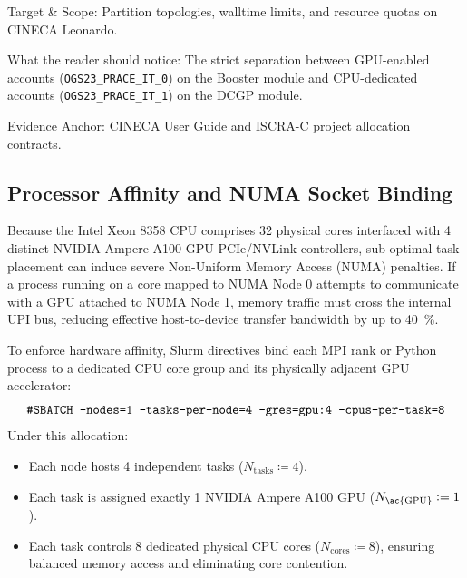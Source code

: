 \begin{table}[htbp]
\begin{threeparttable}
\begin{tablenotes}[flushleft]
      \footnotesize
    \item Target \& Scope: Partition topologies, walltime limits,
      and resource quotas on \ac{CINECA} Leonardo.
    \item What the reader should notice: The strict separation
      between \ac{GPU}-enabled accounts
      (\texttt{OGS23\_PRACE\_IT\_0}) on the Booster module and
      \ac{CPU}-dedicated accounts (\texttt{OGS23\_PRACE\_IT\_1}) on the
      \ac{DCGP} module.
    \item Evidence Anchor: \ac{CINECA} User Guide and ISCRA-C project
      allocation contracts.
    \end{tablenotes}
  \end{threeparttable}
\end{table}

\subsection{Processor Affinity and NUMA Socket Binding}
Because the Intel Xeon 8358 \ac{CPU} comprises \num{32} physical cores
interfaced with \num{4} distinct NVIDIA Ampere A100 \ac{GPU}
PCIe/NVLink controllers,
sub-optimal task placement can induce severe Non-Uniform Memory
Access (\ac{NUMA}) penalties. If a process running on a core mapped
to NUMA Node 0 attempts to communicate with a \ac{GPU} attached to NUMA
Node 1, memory traffic must cross the internal UPI bus, reducing
effective host-to-device transfer bandwidth by up to \qty{40}{\percent}.

To enforce hardware affinity, Slurm directives bind each \ac{MPI} rank or
Python process to a dedicated \ac{CPU} core group and its physically
adjacent \ac{GPU} accelerator:
\begin{equation}
  \text{\texttt{\#SBATCH --nodes=1 --tasks-per-node=4 --gres=gpu:4
  --cpus-per-task=8}}
\end{equation}
Under this allocation:
\begin{itemize}
  \item Each node hosts \num{4} independent tasks
    ($N_{\mathrm{tasks}} \coloneqq \num{4}$).
  \item Each task is assigned exactly \num{1} NVIDIA Ampere A100 \ac{GPU}
    ($N_{\mathrm{\ac{GPU}}} \coloneqq \num{1}$).
  \item Each task controls \num{8} dedicated physical \ac{CPU} cores
    ($N_{\mathrm{cores}} \coloneqq \num{8}$), ensuring balanced memory access
    and eliminating core contention.
\end{itemize}

